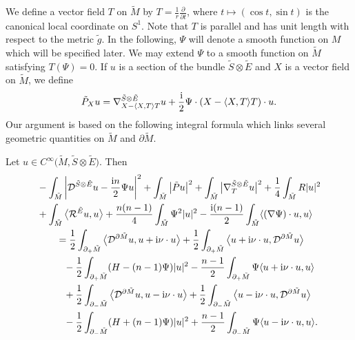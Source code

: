 We define a vector field $T$ on $\tilde{M}$ by $T = \frac{1}{r} \frac{\partial}{\partial t}$, where $t \mapsto (\cos t,\sin t)$ is the canonical local coordinate on $S^1$. Note that $T$ is parallel and has unit length with respect to the metric $\tilde{g}$. In the following, $\Psi$ will denote a smooth function on $M$ which will be specified later. We may extend $\Psi$ to a smooth function on $\tilde{M}$ satisfying $T(\Psi) = 0$. If $u$ is a section of the bundle $\tilde{S} \otimes \tilde{E}$ and $X$ is a vector field on $\tilde{M}$, we define
\begin{equation} \label{def:tildeP}
\tilde{P}_X u = \nabla_{X - \langle X,T \rangle T}^{\tilde{S} \otimes \tilde{E}} u + \frac{\rm i}{2} \Psi \cdot (X - \langle X,T \rangle T) \cdot u.
\end{equation}
Our argument is based on the following integral formula which links several geometric quantities on $\tilde{M}$ and $\partial \tilde{M}$.

\begin{Proposition}
\label{integral_formula_even_dim}
Let $u \in C^\infty\big(\tilde{M},\tilde{S} \otimes \tilde{E}\big)$. Then
\begin{align*}
& - \int_{\tilde{M}} \left|\mathcal{D}^{\tilde{S} \otimes \tilde{E}} u - \frac{{\rm i}n}{2} \Psi u\right|^2 + \int_{\tilde{M}} \big|\tilde{P} u\big|^2 + \int_{\tilde{M}} \big|\nabla_T^{\tilde{S} \otimes \tilde{E}} u\big|^2 + \frac{1}{4} \int_{\tilde{M}} R |u|^2 \\
&+ \int_{\tilde{M}} \big\langle \mathcal{R}^{\tilde{E}} u,u \big\rangle + \frac{n(n-1)}{4} \int_{\tilde{M}} \Psi^2 |u|^2 - \frac{{\rm i}(n-1)}{2} \int_{\tilde{M}} \langle (\nabla \Psi) \cdot u,u \rangle \\
&\qquad= \frac{1}{2} \int_{\partial_+ \tilde{M}} \big\langle \mathcal{D}^{\partial \tilde{M}} u,u + {\rm i} \nu \cdot u \big\rangle + \frac{1}{2} \int_{\partial_+ \tilde{M}} \big\langle u + {\rm i} \nu \cdot u,\mathcal{D}^{\partial \tilde{M}} u \big\rangle \\
&\phantom{\qquad=}{} - \frac{1}{2} \int_{\partial_+ \tilde{M}} (H-(n-1)\Psi) |u|^2 - \frac{n-1}{2} \int_{\partial_+ \tilde{M}} \Psi \langle u + {\rm i} \nu \cdot u,u \rangle \\
&\phantom{\qquad=}{} + \frac{1}{2} \int_{\partial_- \tilde{M}} \big\langle \mathcal{D}^{\partial \tilde{M}} u,u - {\rm i} \nu \cdot u \big\rangle + \frac{1}{2} \int_{\partial_- \tilde{M}} \big\langle u - {\rm i} \nu \cdot u,\mathcal{D}^{\partial \tilde{M}} u \big\rangle \\
&\phantom{\qquad=}{} - \frac{1}{2} \int_{\partial_- \tilde{M}} (H+(n-1)\Psi) |u|^2 + \frac{n-1}{2} \int_{\partial_- \tilde{M}} \Psi \langle u - {\rm i} \nu \cdot u,u \rangle.
\end{align*}
\end{Proposition}

